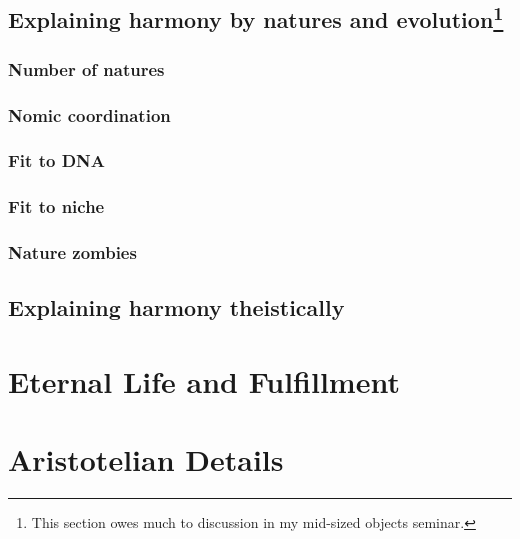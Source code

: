 \section{Explaining harmony by natures and evolution\footnote{This section owes much to discussion in my mid-sized objects seminar.}}
\subsection{Number of natures}
\subsection{Nomic coordination}
\subsection{Fit to DNA}
\subsection{Fit to niche}
\subsection{Nature zombies}
\section{Explaining harmony theistically}
\chaptertail

\def\mychapter{VIII}

\chapter{Eternal Life and Fulfillment}\label{ch:eternal-life}
\chaptertail

\def\mychapter{IX}

\chapter{Aristotelian Details}\label{ch:details}
\chaptertail
